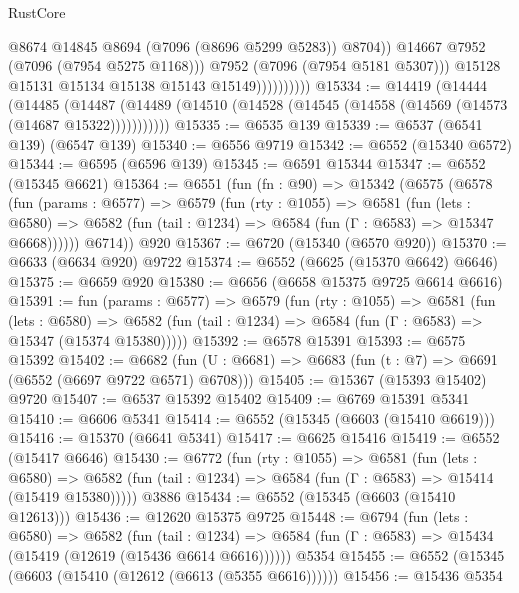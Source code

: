 \begin{lexlean}{RustCore}
\begin{coremodule}
                                @8674
                                @14845
                                @8694
                                (@7096 (@8696 @5299 @5283))
                                @8704))
                            @14667
                            @7952
                            (@7096 (@7954 @5275 @1168)))
                          @7952
                          (@7096 (@7954 @5181 @5307)))
                        @15128
                        @15131
                        @15134
                        @15138
                        @15143
                        @15149))))))))))
@15334 := @14419
    (@14444
      (@14485
        (@14487 (@14489 (@14510 (@14528 (@14545 (@14558 (@14569 (@14573 (@14687 @15322)))))))))))
@15335 := @6535 @139
@15339 := @6537 (@6541 @139) (@6547 @139)
@15340 := @6556 @9719
@15342 := @6552 (@15340 @6572)
@15344 := @6595 (@6596 @139)
@15345 := @6591 @15344
@15347 := @6552 (@15345 @6621)
@15364 := @6551
    (fun (fn : @90) =>
    @15342
      (@6575
        (@6578
          (fun (params : @6577) =>
          @6579
            (fun (rty : @1055) =>
            @6581
              (fun (lets : @6580) =>
              @6582 (fun (tail : @1234) => @6584 (fun (Γ : @6583) => @15347 @6668))))))
        @6714))
    @920
@15367 := @6720 (@15340 (@6570 @920))
@15370 := @6633 (@6634 @920) @9722
@15374 := @6552 (@6625 (@15370 @6642) @6646)
@15375 := @6659 @920
@15380 := @6656 (@6658 @15375 @9725 @6614 @6616)
@15391 := fun (params : @6577) =>
  @6579
    (fun (rty : @1055) =>
    @6581
      (fun (lets : @6580) =>
      @6582 (fun (tail : @1234) => @6584 (fun (Γ : @6583) => @15347 (@15374 @15380)))))
@15392 := @6578 @15391
@15393 := @6575 @15392
@15402 := @6682 (fun (U : @6681) => @6683 (fun (t : @7) => @6691 (@6552 (@6697 @9722 @6571) @6708)))
@15405 := @15367 (@15393 @15402) @9720
@15407 := @6537 @15392 @15402
@15409 := @6769 @15391 @5341
@15410 := @6606 @5341
@15414 := @6552 (@15345 (@6603 (@15410 @6619)))
@15416 := @15370 (@6641 @5341)
@15417 := @6625 @15416
@15419 := @6552 (@15417 @6646)
@15430 := @6772
    (fun (rty : @1055) =>
    @6581
      (fun (lets : @6580) =>
      @6582 (fun (tail : @1234) => @6584 (fun (Γ : @6583) => @15414 (@15419 @15380)))))
    @3886
@15434 := @6552 (@15345 (@6603 (@15410 @12613)))
@15436 := @12620 @15375 @9725
@15448 := @6794
    (fun (lets : @6580) =>
    @6582
      (fun (tail : @1234) =>
      @6584 (fun (Γ : @6583) => @15434 (@15419 (@12619 (@15436 @6614 @6616))))))
    @5354
@15455 := @6552 (@15345 (@6603 (@15410 (@12612 (@6613 (@5355 @6616))))))
@15456 := @15436 @5354

\end{coremodule}
\end{lexlean}
